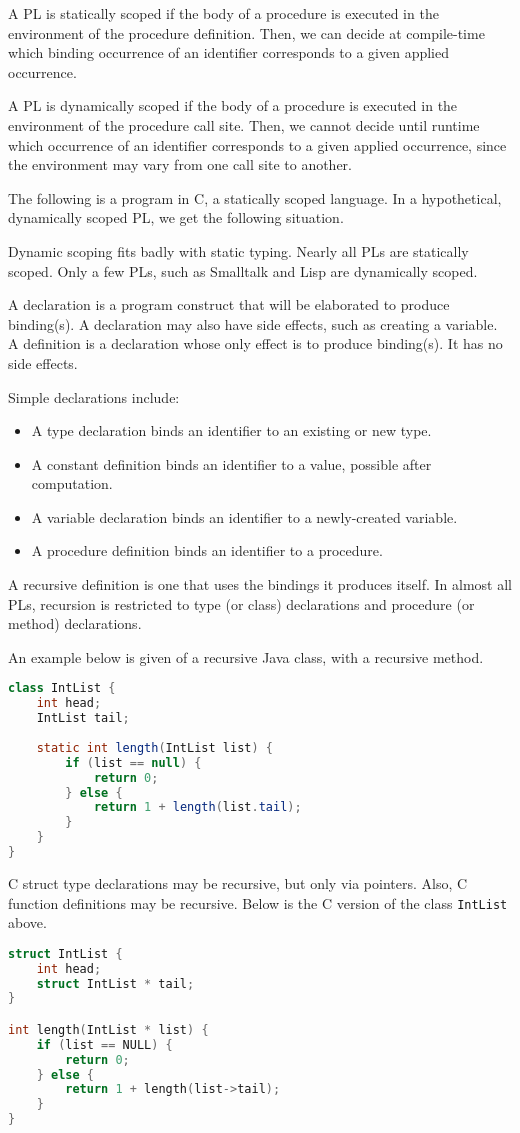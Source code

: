 \documentclass[a4paper, openany]{memoir}
\begin{document}
A PL is statically scoped if the body of a procedure is executed in the environment of the procedure definition. Then, we can decide at compile-time which binding occurrence of an identifier corresponds to a given applied occurrence. 

A PL is dynamically scoped if the body of a procedure is executed in the environment of the procedure call site. Then, we cannot decide until runtime which occurrence of an identifier corresponds to a given applied occurrence, since the environment may vary from one call site to another.

The following is a program in C, a statically scoped language.
In a hypothetical, dynamically scoped PL, we get the following situation.

Dynamic scoping fits badly with static typing. Nearly all PLs are statically scoped. Only a few PLs, such as Smalltalk and Lisp are dynamically scoped.

A declaration is a program construct that will be elaborated to produce binding(s). A declaration may also have side effects, such as creating a variable. A definition is a declaration whose only effect is to produce binding(s). It has no side effects.

Simple declarations include:
\begin{itemize}
    \item A type declaration binds an identifier to an existing or new type.
    \item A constant definition binds an identifier to a value, possible after computation.
    \item A variable declaration binds an identifier to a newly-created variable.
    \item A procedure definition binds an identifier to a procedure.
\end{itemize}

A recursive definition is one that uses the bindings it produces itself. In almost all PLs, recursion is restricted to type (or class) declarations and procedure (or method) declarations. 

An example below is given of a recursive Java class, with a recursive method.
\begin{lstlisting}[language=Java]
class IntList {
    int head;
    IntList tail;
    
    static int length(IntList list) {
        if (list == null) {
            return 0;
        } else {
            return 1 + length(list.tail);
        }
    }
}
\end{lstlisting}
C struct type declarations may be recursive, but only via pointers. Also, C function definitions may be recursive. Below is the C version of the class \texttt{IntList} above.
\begin{lstlisting}[language=C]
struct IntList {
    int head;
    struct IntList * tail;
}

int length(IntList * list) {
    if (list == NULL) {
        return 0;
    } else {
        return 1 + length(list->tail);
    }
}
\end{lstlisting}
\newpage
\end{document}
